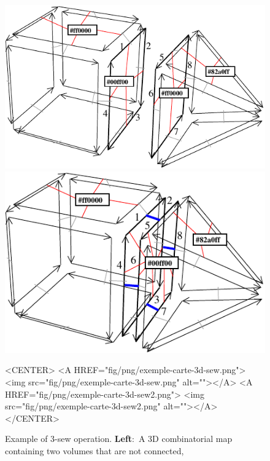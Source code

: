 \def\LargFig{.45\textwidth}
\begin{figure}
  \begin{ccTexOnly}
    \begin{center}
      \includegraphics[width=\LargFig]{Combinatorial_map/fig/pdf/exemple-carte-3d-sew}\qquad
      \includegraphics[width=\LargFig]{Combinatorial_map/fig/pdf/exemple-carte-3d-sew2}
    \end{center}
  \end{ccTexOnly}
  \begin{ccHtmlOnly}
    <CENTER> <A HREF="fig/png/exemple-carte-3d-sew.png"> <img
    src="fig/png/exemple-carte-3d-sew.png" alt=""></A> <A
    HREF="fig/png/exemple-carte-3d-sew2.png"> <img
    src="fig/png/exemple-carte-3d-sew2.png" alt=""></A> </CENTER>
  \end{ccHtmlOnly}
  \caption{Example of 3-sew operation. \textbf{Left}:~A 3D
    combinatorial map containing two volumes that are not connected,
}
\end{figure}
